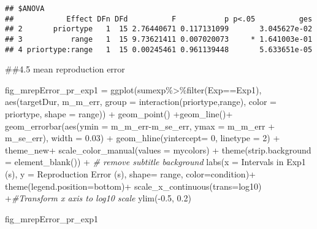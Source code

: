 \documentclass[
]{article}
\newenvironment{Shaded}{\begin{snugshade}}{\end{snugshade}}
\newcommand{\AttributeTok}[1]{\textcolor[rgb]{0.77,0.63,0.00}{#1}}
\newcommand{\CommentTok}[1]{\textcolor[rgb]{0.56,0.35,0.01}{\textit{#1}}}
\newcommand{\DecValTok}[1]{\textcolor[rgb]{0.00,0.00,0.81}{#1}}
\newcommand{\FloatTok}[1]{\textcolor[rgb]{0.00,0.00,0.81}{#1}}
\newcommand{\FunctionTok}[1]{\textcolor[rgb]{0.00,0.00,0.00}{#1}}
\newcommand{\NormalTok}[1]{#1}
\newcommand{\OtherTok}[1]{\textcolor[rgb]{0.56,0.35,0.01}{#1}}
\newcommand{\SpecialCharTok}[1]{\textcolor[rgb]{0.00,0.00,0.00}{#1}}
\newcommand{\StringTok}[1]{\textcolor[rgb]{0.31,0.60,0.02}{#1}}
\begin{document}
\begin{verbatim}
## $ANOVA
##            Effect DFn DFd          F           p p<.05          ges
## 2       priortype   1  15 2.76440671 0.117131099       3.045627e-02
## 3           range   1  15 9.73621411 0.007020073     * 1.641003e-01
## 4 priortype:range   1  15 0.00245461 0.961139448       5.633651e-05
\end{verbatim}

\#\#4.5 mean reproduction error

\begin{Shaded}
\begin{Highlighting}[]
\NormalTok{fig\_mrepError\_pr\_exp1 }\OtherTok{=} \FunctionTok{ggplot}\NormalTok{(sumexp}\SpecialCharTok{\%\textgreater{}\%}\FunctionTok{filter}\NormalTok{(Exp}\SpecialCharTok{==}\StringTok{\textquotesingle{}Exp1\textquotesingle{}}\NormalTok{),}
                          \FunctionTok{aes}\NormalTok{(targetDur, }
\NormalTok{                              m\_m\_err, }
                              \AttributeTok{group =} \FunctionTok{interaction}\NormalTok{(priortype,range),}
                              \AttributeTok{color =}\NormalTok{ priortype,}
                              \AttributeTok{shape =}\NormalTok{ range)) }\SpecialCharTok{+} 
  \FunctionTok{geom\_point}\NormalTok{() }\SpecialCharTok{+}\FunctionTok{geom\_line}\NormalTok{()}\SpecialCharTok{+}
  \FunctionTok{geom\_errorbar}\NormalTok{(}\FunctionTok{aes}\NormalTok{(}\AttributeTok{ymin =}\NormalTok{ m\_m\_err}\SpecialCharTok{{-}}\NormalTok{m\_se\_err, }\AttributeTok{ymax =}\NormalTok{ m\_m\_err }\SpecialCharTok{+}\NormalTok{ m\_se\_err), }\AttributeTok{width =} \FloatTok{0.03}\NormalTok{) }\SpecialCharTok{+} 
  \FunctionTok{geom\_hline}\NormalTok{(}\AttributeTok{yintercept=} \DecValTok{0}\NormalTok{, }\AttributeTok{linetype =} \DecValTok{2}\NormalTok{) }\SpecialCharTok{+}
\NormalTok{  theme\_new}\SpecialCharTok{+} 
  \FunctionTok{scale\_color\_manual}\NormalTok{(}\AttributeTok{values =}\NormalTok{ mycolors) }\SpecialCharTok{+}
  \FunctionTok{theme}\NormalTok{(}\AttributeTok{strip.background =} \FunctionTok{element\_blank}\NormalTok{()) }\SpecialCharTok{+} \CommentTok{\# remove subtitle background}
  \FunctionTok{labs}\NormalTok{(}\AttributeTok{x =} \StringTok{\textquotesingle{}Intervals in Exp1 (s)\textquotesingle{}}\NormalTok{, }\AttributeTok{y =} \StringTok{\textquotesingle{}Reproduction Error (s)\textquotesingle{}}\NormalTok{, }\AttributeTok{shape=} \StringTok{\textquotesingle{}range\textquotesingle{}}\NormalTok{, }\AttributeTok{color=}\StringTok{\textquotesingle{}condition\textquotesingle{}}\NormalTok{)}\SpecialCharTok{+} \FunctionTok{theme}\NormalTok{(}\AttributeTok{legend.position=}\StringTok{\textquotesingle{}bottom\textquotesingle{}}\NormalTok{)}\SpecialCharTok{+}
  \FunctionTok{scale\_x\_continuous}\NormalTok{(}\AttributeTok{trans=}\StringTok{\textquotesingle{}log10\textquotesingle{}}\NormalTok{) }\SpecialCharTok{+}\CommentTok{\#Transform x axis to log10 scale}
  \FunctionTok{ylim}\NormalTok{(}\SpecialCharTok{{-}}\FloatTok{0.5}\NormalTok{, }\FloatTok{0.2}\NormalTok{)}


\NormalTok{fig\_mrepError\_pr\_exp1}
\end{Highlighting}
\end{Shaded}
\end{document}
